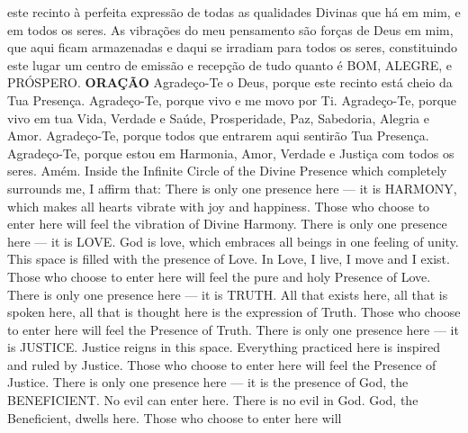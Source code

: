 {\begin{songs}{}
        este recinto à perfeita expressão de todas as
        qualidades Divinas que há em mim, e em todos os
        seres.
        \parspace
        As vibrações do meu pensamento são forças de Deus
        em mim, que aqui ficam armazenadas e daqui se
        irradiam para todos os seres, constituindo este
        lugar um centro de emissão e recepção de tudo
        quanto é BOM, ALEGRE, e PRÓSPERO.
        \parspace
        \textbf{ORAÇÃO}
        \parspace
        Agradeço-Te o Deus, porque este recinto está cheio
        da Tua Presença.
        \parspace
        Agradeço-Te, porque vivo e me movo por Ti.
        \parspace
        Agradeço-Te, porque vivo em tua Vida, Verdade e
        Saúde, Prosperidade, Paz, Sabedoria, Alegria e Amor.
        \parspace
        Agradeço-Te, porque todos que entrarem aqui sentirão
        Tua Presença.
        \parspace
        Agradeço-Te, porque estou em Harmonia, Amor, Verdade
        e Justiça com todos os seres.
        \parspace
        Amém.
      \endverse
      \beginverse\color{englishcolor}
        \parspace
        Inside the Infinite Circle of the Divine Presence
        which completely surrounds me, I affirm that:
        \parspace
        There is only one presence here --- it is HARMONY,
        which makes all hearts vibrate with joy and happiness.
        Those who choose to enter here will feel the vibration
        of Divine Harmony.
        \parspace
        There is only one presence here --- it is LOVE.
        God is love, which embraces all beings in one
        feeling of unity. This space is filled with the
        presence of Love. In Love, I live, I move and I
        exist. Those who choose to enter here will feel
        the pure and holy Presence of Love.
        \parspace
        There is only one presence here --- it is TRUTH.
        All that exists here, all that is spoken here,
        all that is thought here is the expression of
        Truth. Those who choose to enter here will feel
        the Presence of Truth.
        \parspace
        There is only one presence here --- it is JUSTICE.
        Justice reigns in this space. Everything practiced
        here is inspired and ruled by Justice. Those who
        choose to enter here will feel the Presence of
        Justice.
        \parspace
        There is only one presence here --- it is the
        presence of God, the BENEFICIENT. No evil can enter
        here. There is no evil in God. God, the Beneficient,
        dwells here. Those who choose to enter here will

\end{songs}}
